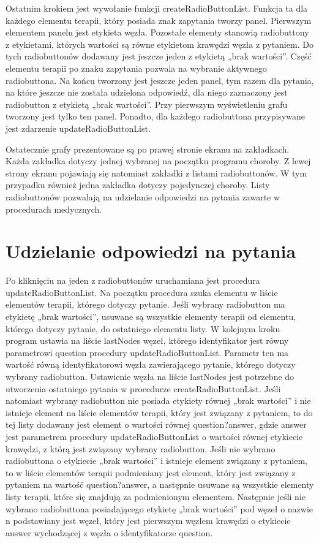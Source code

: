 \documentclass[oneside,a4paper]{book}
\begin{document}
\begin{spacing}{1.5}
Ostatnim krokiem jest wywołanie funkcji createRadioButtonList. Funkcja ta dla każdego elementu terapii, który posiada znak zapytania tworzy panel. Pierwszym elementem panelu jest etykieta węzła. Pozostałe elementy stanowią radiobuttony z etykietami, których wartości są równe etykietom krawędzi węzła z pytaniem. Do tych radiobuttonów dodawany jest jeszcze jeden z etykietą „brak wartości”. Część elementu terapii po znaku zapytania pozwala na wybranie aktywnego radiobuttona. Na końcu tworzony jest jeszcze jeden panel, tym razem dla pytania, na które jeszcze nie została udzielona odpowiedź, dla niego zaznaczony jest radiobutton z etykietą „brak wartości”. Przy pierwszym wyświetleniu grafu tworzony jest tylko ten panel. Ponadto, dla każdego radiobuttona przypisywane jest zdarzenie updateRadioButtonList.
 
Ostatecznie grafy prezentowane są po prawej stronie ekranu na zakładkach. Każda zakładka dotyczy jednej wybranej na początku programu choroby. Z lewej strony ekranu pojawiają się natomiast zakładki z listami radiobuttonów. W tym przypadku również jedna zakładka dotyczy pojedynczej choroby. Listy radiobuttonów pozwalają na udzielanie odpowiedzi na pytania zawarte w procedurach medycznych.


\section{Udzielanie odpowiedzi na pytania}

Po kliknięciu na jeden z radiobuttonów uruchamiana jest procedura updateRadioButtonList. Na początku procedura szuka elementu w liście elementów terapii, którego dotyczy pytanie. Jeśli wybrany radiobutton ma etykietę „brak wartości”, usuwane są wszystkie elementy terapii od elementu, którego dotyczy pytanie, do ostatniego elementu listy. W kolejnym kroku program ustawia na liście lastNodes węzeł, którego identyfikator jest równy parametrowi question procedury updateRadioButtonList. Parametr ten ma wartość równą identyfikatorowi węzła zawierającego pytanie, którego dotyczy wybrany radiobutton. Ustawienie węzła na liście lastNodes jest potrzebne do utworzenia ostatniego pytania w procedurze createRadioButtonList. Jeśli natomiast wybrany radiobutton nie posiada etykiety równej „brak wartości” i nie istnieje element na liście elementów terapii, który jest związany z pytaniem, to do tej listy dodawany jest element o wartości równej question?answer, gdzie answer jest parametrem procedury updateRadioButtonList o wartości równej etykiecie krawędzi, z którą jest związany wybrany radiobutton. Jeśli nie wybrano radiobuttona o etykiecie „brak wartości” i istnieje element związany z pytaniem, to w liście elementów terapii podmieniany jest element, który jest związany z pytaniem na wartość question?answer, a następnie usuwane są wszystkie elementy listy terapii, które się znajdują za podmienionym elementem. Następnie jeśli nie wybrano radiobuttona posiadającego etykietę „brak wartości” pod węzeł o nazwie n podstawiany jest węzeł, który jest pierwszym węzłem krawędzi o etykiecie answer wychodzącej z węzła o identyfikatorze question. 


\end{spacing}
\end{document}
